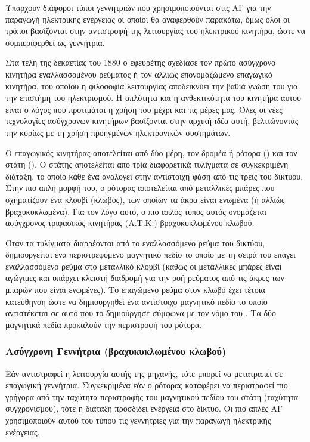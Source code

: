\documentclass[12pt]{report}
\begin{document}
Υπάρχουν διάφοροι τύποι γεννητριών που χρησιμοποιούνται στις ΑΓ για την παραγωγή ηλεκτρικής ενέργειας οι οποίοι θα αναφερθούν παρακάτω, όμως όλοι οι τρόποι βασίζονται στην αντιστροφή της λειτουργίας του ηλεκτρικού κινητήρα, 
ώστε να συμπεριφερθεί ως γεννήτρια. 

Στα τέλη της δεκαετίας του 1880 ο εφευρέτης {} σχεδίασε τον πρώτο ασύγχρονο κινητήρα εναλλασσομένου ρεύματος ή τον αλλιώς επονομαζώμενο επαγωγικό κινητήρα, του οποίου η φιλοσοφία λειτουργίας αποδεικνύει την
βαθιά γνώση του {} για την επιστήμη του ηλεκτρισμού. 
Η απλότητα και η ανθεκτικότητα του κινητήρα αυτού είναι ο λόγος που προτιμάται η χρήση του μέχρι και τις μέρες μας. 
Όλες οι νέες τεχνολογίες ασύγχρονων κινητήρων βασίζονται στην αρχική ιδέα αυτή, βελτιώνοντάς την κυρίως με τη χρήση προηγμένων ηλεκτρονικών συστημάτων.

Ο επαγωγικός κινητήρας αποτελείται από δύο μέρη, τον δρομέα ή ρότορα ({}) και τον στάτη ({}). Ο στάτης αποτελείται από τρία διαφορετικά τυλίγματα σε συγκεκριμένη διάταξη, το οποίο κάθε 
ένα αναλογεί στην αντίστοιχη φάση από τις τρεις του δικτύου. Στην πιο απλή μορφή του, ο ρότορας αποτελείται από μεταλλικές μπάρες που σχηματίζουν ένα κλουβί (κλωβός), των οποίων τα άκρα είναι ενωμένα (ή αλλιώς βραχυκυκλωμένα). 
Για τον λόγο αυτό, ο πιο απλός τύπος αυτός ονομάζεται ασύγχρονος τριφασικός κινητήρας (Α.Τ.Κ.) βραχυκυκλωμένου κλωβού. 

Όταν τα τυλίγματα διαρρέονται από το εναλλασσόμενο ρεύμα του δικτύου, δημιουργείται ένα περιστρεφόμενο μαγνητικό πεδίο το οποίο με τη σειρά του επάγει εναλλασσόμενο ρεύμα στο μεταλλικό κλουβί 
(καθώς οι μεταλλικές μπάρες είναι αγώγιμες και υπάρχει κλειστή διαδρομή για την ροή ρεύματος από τις άκρες των μπαρών που είναι ενωμένες).
Το επαγώμενο ρεύμα στον κλωβό έχει τέτοια κατεύθηνση ώστε να δημιουργηθεί ένα αντίστοιχο μαγνητικό πεδίο το οποίο αντιστέκεται σε αυτό που το δημιούργησε σύμφωνα με τον νόμο του {}. Τα δύο μαγνητικά πεδία  
προκαλούν την περιστροφή του ρότορα.

\subsubsection{Ασύγχρονη Γεννήτρια (βραχυκυκλωμένου κλωβού)}
Εάν αντιστραφεί η λειτουργία αυτής της μηχανής, τότε μπορεί να μετατραπεί σε επαγωγική γεννήτρια. Συγκεκριμένα εάν ο ρότορας καταφέρει να περιστραφεί πιο γρήγορα από την ταχύτητα περιστροφής του μαγνητικού πεδίου του στάτη
(ταχύτητα συγχρονισμού), τότε η διάταξη προσδίδει ενέργεια στο δίκτυο.
Οι πιο απλές ΑΓ χρησιμοποιούν αυτού του τύπου τις γεννήτριες για την παραγωγή ηλεκτρικής ενέργειας. 
\end{document}
